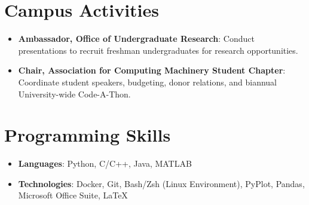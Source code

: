 \documentclass[letterpaper,11pt]{article}
\newcommand{\resumeItem}[2]{
  \item\small{
    \textbf{#1}{: #2 \vspace{-2pt}}
  }
}
\newcommand{\resumeSubItem}[2]{\resumeItem{#1}{#2}\vspace{-4pt}}
\newcommand{\resumeSubHeadingListStart}{\begin{itemize}[leftmargin=*]}
\newcommand{\resumeSubHeadingListEnd}{\end{itemize}}
\begin{document}
%
%
\section{Campus Activities}
  \resumeSubHeadingListStart
    \resumeSubItem{Ambassador, Office of Undergraduate Research}
      {Conduct presentations to recruit freshman undergraduates for research opportunities.}
    \resumeSubItem{Chair, Association for Computing Machinery Student Chapter}
      {Coordinate student speakers, budgeting, donor relations, and biannual University-wide Code-A-Thon.}
  \resumeSubHeadingListEnd

%
\section{Programming Skills}
  \resumeSubHeadingListStart
    \resumeSubItem{Languages}{Python, C/C++, Java, MATLAB}
    \resumeSubItem{Technologies}{Docker, Git, Bash/Zsh (Linux Environment), PyPlot, Pandas, Microsoft Office Suite, \LaTeX}
  \resumeSubHeadingListEnd


\end{document}
